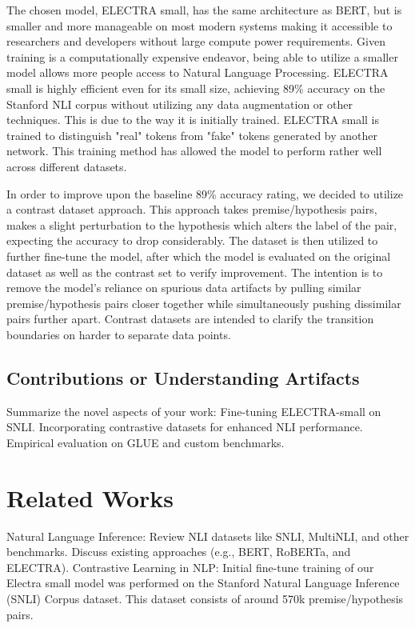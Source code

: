 \documentclass[11pt]{article}
\begin{document}
The chosen model, ELECTRA small, has the same architecture as BERT, but is smaller and more manageable on most modern systems making it accessible to researchers and developers without large compute power requirements. Given training is a computationally expensive endeavor, being able to utilize a smaller model allows more people access to Natural Language Processing. ELECTRA small is highly efficient even for its small size, achieving 89\% accuracy on the Stanford NLI corpus without utilizing any data augmentation or other techniques. This is due to the way it is initially trained. ELECTRA small is trained to distinguish "real" tokens from "fake" tokens generated by another network. This training method has allowed the model to perform rather well across different datasets. \citealp{googleelectrablog}

In order to improve upon the baseline 89\% accuracy rating, we decided to utilize a contrast dataset approach. This approach takes premise/hypothesis pairs, makes a slight perturbation to the hypothesis which alters the label of the pair, expecting the accuracy to drop considerably.  The dataset is then utilized to further fine-tune the model, after which the model is evaluated on the original dataset as well as the contrast set to verify improvement. The intention is to remove the model's reliance on spurious data artifacts by pulling similar premise/hypothesis pairs closer together while simultaneously pushing dissimilar pairs further apart.  Contrast datasets are intended to clarify the transition boundaries on harder to separate data points. \citealp{localdecisionboundaries}

\subsection{Contributions or Understanding Artifacts}
Summarize the novel aspects of your work:
Fine-tuning ELECTRA-small on SNLI.
Incorporating contrastive datasets for enhanced NLI performance.
Empirical evaluation on GLUE and custom benchmarks.

\citealp{premise4granted}
\section{Related Works}
Natural Language Inference:
Review NLI datasets like SNLI, MultiNLI, and other benchmarks.
Discuss existing approaches (e.g., BERT, RoBERTa, and ELECTRA).
Contrastive Learning in NLP:
Initial fine-tune training of our Electra small model was performed on the Stanford Natural Language Inference (SNLI) Corpus dataset. This dataset consists of around 570k premise/hypothesis pairs. \citealp{snlicorpus}
\end{document}
